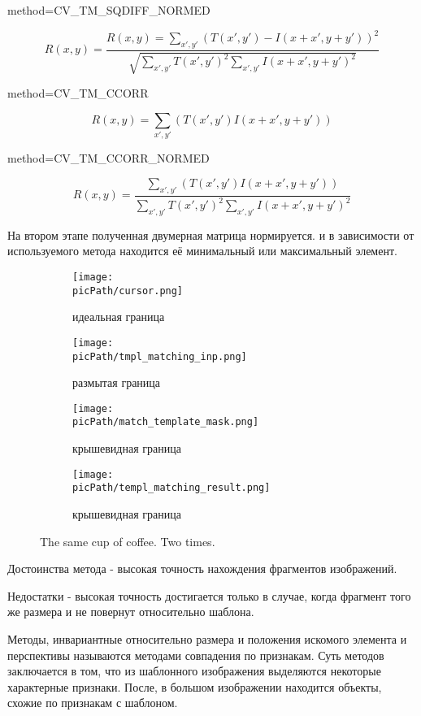 \documentclass[oneside,final,14pt]{extreport}
\newcommand{\picPath}{pictures}
\begin{document}
method=CV\_TM\_SQDIFF\_NORMED

$$
R(x,y)
=
\frac{
R(x,y)
=
\sum_{x',y'}
(T(x',y')-I(x+x',y+y'))^2
}
{
\sqrt{
	\sum_{x',y'}
	T(x',y')^2
	\sum_{x',y'}
	I(x+x',y+y')^2
	}
}
$$

method=CV\_TM\_CCORR

$$
R(x,y)
=
\sum_{x',y'}
( T(x',y')I(x+x',y+y'))
$$

method=CV\_TM\_CCORR\_NORMED

$$
R(x,y)
=
\frac{
	\sum_{x',y'}
	( T(x',y')I(x+x',y+y'))
}
{
	\sum_{x',y'}
	T(x',y')^2
	\sum_{x',y'}
	I(x+x',y+y')^2
}
$$

На втором этапе полученная двумерная матрица нормируется. и в зависимости от используемого метода находится её минимальный или максимальный элемент.

\begin{figure}[h!]
  \centering
  \begin{subfigure}[b]{0.09\linewidth}
    \texttt{[image: \\picPath/cursor.png]}
    \caption{ идеальная граница}
  \end{subfigure}
  \begin{subfigure}[b]{0.4\linewidth}
    \texttt{[image: \\picPath/tmpl\_matching\_inp.png]}
    \caption{размытая граница}
  \end{subfigure}
  \begin{subfigure}[b]{0.4\linewidth}
    \texttt{[image: \\picPath/match\_template\_mask.png]}
    \caption{крышевидная граница}
  \end{subfigure}
  \begin{subfigure}[b]{0.4\linewidth}
    \texttt{[image: \\picPath/templ\_matching\_result.png]}
    \caption{крышевидная граница}
  \end{subfigure}
  \caption{The same cup of coffee. Two times.}
  \label{fig:coffee}
\end{figure}

Достоинства метода  - высокая точность нахождения фрагментов изображений.

Недостатки - высокая точность достигается только в случае, когда фрагмент того же размера и не повернут относительно шаблона. 
	
	Методы, инвариантные относительно размера и положения искомого элемента и перспективы называются методами совпадения по признакам. Суть методов заключается в том, что из шаблонного изображения выделяются некоторые характерные признаки. После, в большом изображении находится объекты, схожие по признакам с шаблоном.
	
\end{document}
